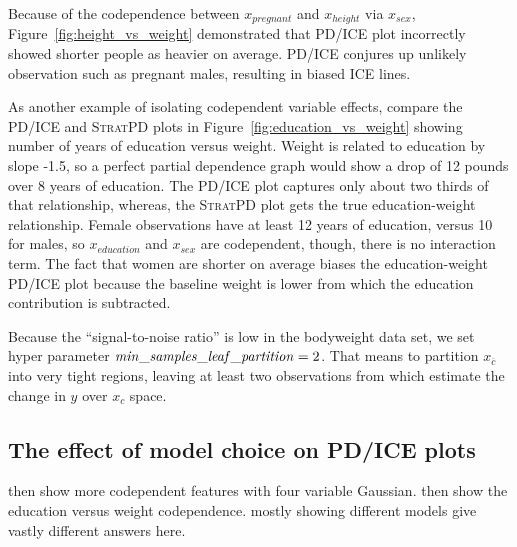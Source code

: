 \documentclass[12pt]{article}
\newcommand{\figref}[1]{Figure~\ref{#1}}
\newcommand{\cut}[1]{}
\newcommand{\spd}{\fontfamily{cmr}\textsc{\small StratPD}}
\newcommand{\xnc}{$x_{\overline{c}}$}
\begin{document}
\cut{
def toy_weight_data(n):
    df = pd.DataFrame()
    nmen = n//2
    nwomen = n//2
    df['sex'] = ['M']*nmen + ['F']*nwomen
    df.loc[df['sex']=='F','pregnant'] = np.random.randint(0,2,size=(nwomen,))
    df.loc[df['sex']=='M','pregnant'] = 0
    df.loc[df['sex']=='M','height'] = 5*12+8 + np.random.uniform(-7, +8, size=(nmen,))
    df.loc[df['sex']=='F','height'] = 5*12+5 + np.random.uniform(-4.5, +5, size=(nwomen,))
    df.loc[df['sex']=='M','education'] = 10 + np.random.randint(0,8,size=nmen)
    df.loc[df['sex']=='F','education'] = 12 + np.random.randint(0,8,size=nwomen)
}

Because of the codependence between $x_{pregnant}$ and $x_{height}$ via $x_{sex}$, \figref{fig:height_vs_weight} demonstrated that PD/ICE plot incorrectly showed shorter people as heavier on average. PD/ICE conjures up unlikely observation such as pregnant males, resulting in biased ICE lines.

As another example of isolating codependent variable effects, compare the PD/ICE and \spd{} plots in \figref{fig:education_vs_weight} showing number of years of education versus weight. Weight is related to education by slope -1.5, so a perfect partial dependence graph would show a drop of 12 pounds over 8 years of education. The PD/ICE plot captures only about two thirds of that relationship, whereas, the \spd{} plot gets the true education-weight relationship.  Female observations have at least 12 years of education, versus 10 for males, so $x_{education}$ and $x_{sex}$ are codependent, though, there is no interaction term. The fact that women are shorter on average biases the education-weight PD/ICE plot because the baseline weight is lower from which the education contribution is  subtracted.  

Because the ``signal-to-noise ratio'' is low in the bodyweight data set, we set hyper parameter ${\it min\_samples\_leaf\_partition}=2$. That means to partition \xnc{} into very tight regions, leaving at least two observations from which estimate the change in $y$ over $x_c$ space.

\subsection{The effect of model choice on PD/ICE plots}

then show more codependent features with four variable Gaussian. then show the education versus weight codependence.  mostly showing different models give vastly different answers here.
\end{document}

